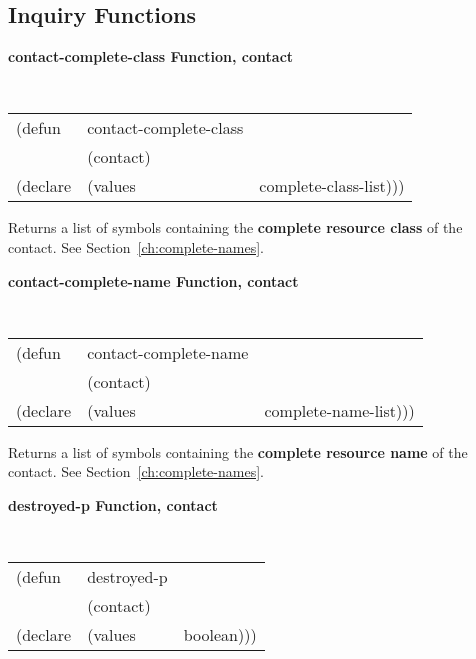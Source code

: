 \documentclass[twoside]{book}
\begin{document}
\begin{sloppy}
\begin{flushright}
{}\end{flushright}

\subsection*{Inquiry Functions}

{\samepage
{\large {\bf contact-complete-class \hfill Function, contact}}
\begin{flushright} \parbox[t]{6.125in}{
\tt
\begin{tabular}{lll}
\raggedright
(defun & contact-complete-class & \\
& (contact) \\
(declare & (values & complete-class-list)))
\end{tabular}
\rm
}\end{flushright}
}

\begin{flushright} \parbox[t]{6.125in}{
Returns a list of symbols containing the {\bf complete resource class} of the contact.
See Section~\ref{ch:complete-names}.

}\end{flushright}


{\samepage
{\large {\bf contact-complete-name \hfill Function, contact}}
\begin{flushright}
\parbox[t]{6.125in}{
\tt
\begin{tabular}{lll}
\raggedright
(defun & contact-complete-name & \\
& (contact) \\
(declare & (values & complete-name-list)))
\end{tabular}
}\end{flushright}}

\begin{flushright}
\parbox[t]{6.125in}{
Returns a list of symbols containing the {\bf complete resource name} of the contact.
See Section~\ref{ch:complete-names}.
}\end{flushright}


{\samepage
{\large {\bf destroyed-p \hfill Function, contact}} 
\begin{flushright} \parbox[t]{6.125in}{
\tt
\begin{tabular}{lll}
\raggedright
(defun & destroyed-p & \\ 
& (contact) \\
(declare &(values  & boolean)))
\end{tabular}
\rm

}
\end{flushright}}
\end{sloppy}
\end{document}

